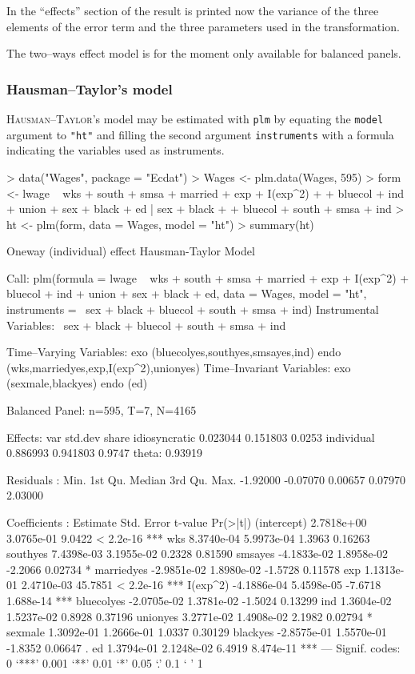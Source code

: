 \documentclass[a4paper]{article}
\begin{document}
In the ``effects'' section of the result is printed now the variance
of the three elements of the error term and the three parameters used
in the transformation. 

The two--ways effect model is for the moment only available for
balanced panels.


\subsubsection{Hausman--Taylor's model}

\textsc{Hausman}--\textsc{Taylor}'s model may be estimated with \texttt{plm}
by equating the \texttt{model} argument to  \texttt{"ht"} and
filling the second argument \texttt{instruments} with a formula
indicating the variables used as instruments.


\begin{Schunk}
\begin{Sinput}
> data("Wages", package = "Ecdat")
> Wages <- plm.data(Wages, 595)
> form <- lwage ~ wks + south + smsa + married + exp + I(exp^2) + 
+     bluecol + ind + union + sex + black + ed | sex + black + 
+     bluecol + south + smsa + ind
> ht <- plm(form, data = Wages, model = "ht")
> summary(ht)
\end{Sinput}
\begin{Soutput}
Oneway (individual) effect Hausman-Taylor Model

Call:
plm(formula = lwage ~ wks + south + smsa + married + exp + I(exp^2) + 
    bluecol + ind + union + sex + black + ed, data = Wages, model = "ht", 
    instruments = ~sex + black + bluecol + south + smsa + ind)
Instrumental Variables:
~sex + black + bluecol + south + smsa + ind

Time--Varying Variables: exo (bluecolyes,southyes,smsayes,ind) endo (wks,marriedyes,exp,I(exp^2),unionyes)
Time--Invariant Variables: exo (sexmale,blackyes) endo (ed)

Balanced Panel: n=595, T=7, N=4165

Effects:
                   var  std.dev  share
idiosyncratic 0.023044 0.151803 0.0253
individual    0.886993 0.941803 0.9747
theta:  0.93919  

Residuals :
    Min.  1st Qu.   Median  3rd Qu.     Max. 
-1.92000 -0.07070  0.00657  0.07970  2.03000 

Coefficients :
               Estimate  Std. Error t-value  Pr(>|t|)    
(intercept)  2.7818e+00  3.0765e-01  9.0422 < 2.2e-16 ***
wks          8.3740e-04  5.9973e-04  1.3963   0.16263    
southyes     7.4398e-03  3.1955e-02  0.2328   0.81590    
smsayes     -4.1833e-02  1.8958e-02 -2.2066   0.02734 *  
marriedyes  -2.9851e-02  1.8980e-02 -1.5728   0.11578    
exp          1.1313e-01  2.4710e-03 45.7851 < 2.2e-16 ***
I(exp^2)    -4.1886e-04  5.4598e-05 -7.6718 1.688e-14 ***
bluecolyes  -2.0705e-02  1.3781e-02 -1.5024   0.13299    
ind          1.3604e-02  1.5237e-02  0.8928   0.37196    
unionyes     3.2771e-02  1.4908e-02  2.1982   0.02794 *  
sexmale      1.3092e-01  1.2666e-01  1.0337   0.30129    
blackyes    -2.8575e-01  1.5570e-01 -1.8352   0.06647 .  
ed           1.3794e-01  2.1248e-02  6.4919 8.474e-11 ***
---
Signif. codes:  0 ‘***’ 0.001 ‘**’ 0.01 ‘*’ 0.05 ‘.’ 0.1 ‘ ’ 1 


\end{Soutput}
\end{Schunk}
\end{document}
